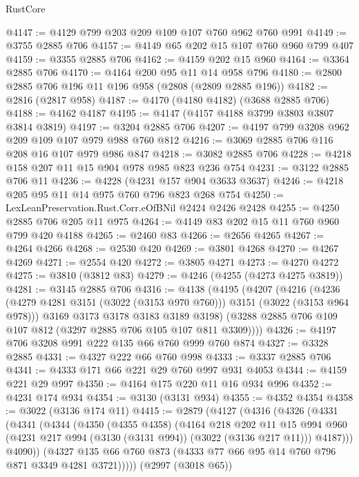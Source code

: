 \begin{lexlean}{RustCore}
\begin{coremodule}
@4147 := @4129 @799 @203 @209 @109 @107 @760 @962 @760 @991
@4149 := @3755 @2885 @706
@4157 := @4149 @65 @202 @15 @107 @760 @960 @799 @407
@4159 := @3355 @2885 @706
@4162 := @4159 @202 @15 @960
@4164 := @3364 @2885 @706
@4170 := @4164 @200 @95 @11 @14 @958 @796
@4180 := @2800 @2885 @706 @196 @11 @196 @958 (@2808 (@2809 @2885 @196))
@4182 := @2816 (@2817 @958)
@4187 := @4170 (@4180 @4182) (@3688 @2885 @706)
@4188 := @4162 @4187
@4195 := @4147 (@4157 @4188 @3799 @3803 @3807 @3814 @3819)
@4197 := @3204 @2885 @706
@4207 := @4197 @799 @3208 @962 @209 @109 @107 @979 @988 @760 @812
@4216 := @3069 @2885 @706 @116 @208 @16 @107 @979 @986 @847
@4218 := @3082 @2885 @706
@4228 := @4218 @158 @207 @11 @15 @904 @978 @985 @823 @236 @754
@4231 := @3122 @2885 @706 @11
@4236 := @4228 (@4231 @157 @904 @3633 @3637)
@4246 := @4218 @205 @95 @11 @14 @975 @760 @796 @823 @268 @754
@4250 := LexLeanPreservation.Rust.Corr.eOfBNil @2424 @2426 @2428
@4255 := @4250 @2885 @706 @205 @11 @975
@4264 := @4149 @83 @202 @15 @11 @760 @960 @799 @420 @4188
@4265 := @2460 @83
@4266 := @2656 @4265
@4267 := @4264 @4266
@4268 := @2530 @420
@4269 := @3801 @4268
@4270 := @4267 @4269
@4271 := @2554 @420
@4272 := @3805 @4271
@4273 := @4270 @4272
@4275 := @3810 (@3812 @83)
@4279 := @4246 (@4255 (@4273 @4275 @3819))
@4281 := @3145 @2885 @706
@4316 := @4138
    (@4195
      (@4207
        (@4216
          (@4236 (@4279 @4281 @3151 (@3022 (@3153 @970 @760))) @3151 (@3022 (@3153 @964 @978)))
          @3169
          @3173
          @3178
          @3183
          @3189
          @3198)
        (@3288 @2885 @706 @109 @107 @812 (@3297 @2885 @706 @105 @107 @811 @3309))))
@4326 := @4197 @706 @3208 @991 @222 @135 @66 @760 @999 @760 @874
@4327 := @3328 @2885
@4331 := @4327 @222 @66 @760 @998
@4333 := @3337 @2885 @706
@4341 := @4333 @171 @66 @221 @29 @760 @997 @931 @4053
@4344 := @4159 @221 @29 @997
@4350 := @4164 @175 @220 @11 @16 @934 @996
@4352 := @4231 @174 @934
@4354 := @3130 (@3131 @934)
@4355 := @4352 @4354
@4358 := @3022 (@3136 @174 @11)
@4415 := @2879
    (@4127
      (@4316
        (@4326
          (@4331
            (@4341
              (@4344
                (@4350
                  (@4355 @4358)
                  (@4164
                    @218
                    @202
                    @11
                    @15
                    @994
                    @960
                    (@4231 @217 @994 (@3130 (@3131 @994)) (@3022 (@3136 @217 @11)))
                    @4187)))
              @4090))
          (@4327 @135 @66 @760 @873 (@4333 @77 @66 @95 @14 @760 @796 @871 @3349 @4281 @3721)))))
    (@2997 (@3018 @65))

\end{coremodule}
\end{lexlean}
